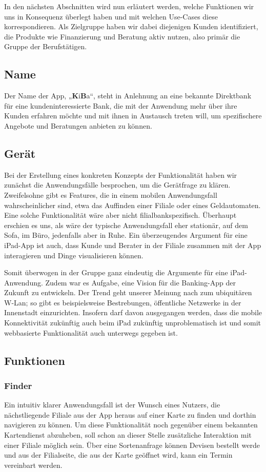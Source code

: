 In den nächsten Abschnitten wird nun erläutert werden, welche Funktionen wir uns in Konsequenz überlegt haben und mit welchen Use-Cases diese korrespondieren. Als Zielgruppe haben wir dabei diejenigen Kunden identifiziert, die Produkte wie Finanzierung und Beratung aktiv nutzen, also primär die Gruppe der Berufstätigen.

\subsection{Name}
    Der Name der App, „\textbf{K}i\textbf{B}a“, steht in Anlehnung an eine bekannte Direktbank für eine kundeninteressierte Bank, die mit der Anwendung mehr über ihre Kunden erfahren möchte und mit ihnen in Austausch treten will, um spezifischere Angebote und Beratungen anbieten zu können.
    
\subsection{Gerät}
    Bei der Erstellung eines konkreten Konzepts der Funktionalität haben wir zunächst die Anwendungsfälle besprochen, um die Gerätfrage zu klären. Zweifelsohne gibt es Features, die in einem mobilen Anwendungsfall wahrscheinlicher sind, etwa das Auffinden einer Filiale oder eines Geldautomaten. Eine solche Funktionalität wäre aber nicht filialbankspezifisch. Überhaupt erschien es uns, als wäre der typische Anwendungsfall eher stationär, auf dem Sofa, im Büro, jedenfalls aber in Ruhe. Ein überzeugendes Argument für eine iPad-App ist auch, dass Kunde und Berater in der Filiale zusammen mit der App interagieren und Dinge visualisieren können.     
    
    Somit überwogen in der Gruppe ganz eindeutig die Argumente für eine iPad-Anwendung. Zudem war es Aufgabe, eine Vision für die Banking-App der Zukunft zu entwickeln. Der Trend geht unserer Meinung nach zum ubiquitären W-Lan; so gibt es beispielsweise Bestrebungen, öffentliche Netzwerke in der Innenstadt einzurichten. Insofern darf davon ausgegangen werden, dass die mobile Konnektivität zukünftig auch beim iPad zukünftig unproblematisch ist und somit webbasierte Funktionalität auch unterwegs gegeben ist.
    
\subsection{Funktionen}

\subsubsection{Finder}
Ein intuitiv klarer Anwendungsfall ist der Wunsch eines Nutzers, die nächstliegende Filiale aus der App heraus auf einer Karte zu finden und dorthin navigieren zu können. Um diese Funktionalität noch gegenüber einem bekannten Kartendienst abzuheben, soll schon an dieser Stelle zusätzliche Interaktion mit einer Filiale möglich sein. Über eine Sortenanfrage können Devisen bestellt werde und aus der Filialseite, die aus der Karte geöffnet wird, kann ein Termin vereinbart werden.

